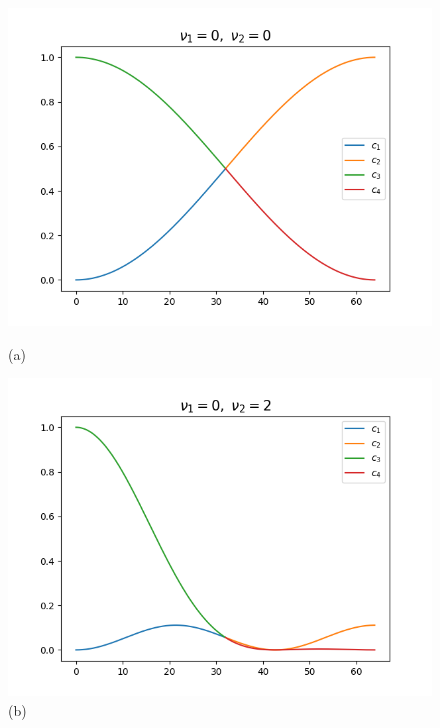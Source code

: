 \documentclass{homework}
\begin{document}
	\begin{figure}[bhpt]
	\begin{minipage}[b]{0.5 \textwidth}
	\includegraphics[width=\textwidth]{Ex8_47_00.png}
	\caption{(a)}
	\end{minipage}
	\hspace{-0.2in}
	\begin{minipage}[b]{0.5 \textwidth}
	\includegraphics[width=\textwidth]{Ex8_47_02.png}
	\caption{(b)}
	\end{minipage}
	
	
	\hspace{-40.0pt}
	\par \vspace{-10.pt}
	\hspace{-36.0pt}
	

\end{figure}
\end{document}
